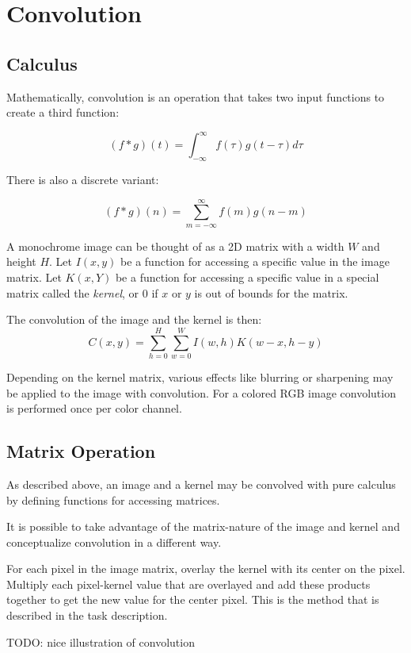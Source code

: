 \section{Convolution}
\subsection{Calculus}
Mathematically, convolution is an operation that takes two input functions to create a third function:

\[
    (f * g)(t) = \int^{\infty}_{-\infty}{f(\tau)g(t-\tau) d\tau}
\]

There is also a discrete variant:

\[
    (f * g)(n) = \sum^{\infty}_{m=-\infty}{f(m)g(n-m)}
\]

A monochrome image can be thought of as a 2D matrix with a width $W$ and height $H$.
Let $I(x, y)$ be a function for accessing a specific value in the image matrix.
Let $K(x, Y)$ be a function for accessing a specific value in a special matrix called the \textit{kernel},
or $0$ if $x$ or $y$ is out of bounds for the matrix.

The convolution of the image and the kernel is then:
\[
    C(x, y) = \sum^{H}_{h=0} \sum^{W}_{w=0}{I(w, h)K(w - x, h -y)}
\]

Depending on the kernel matrix,
various effects like blurring or sharpening may be applied to the image with convolution.
For a colored RGB image convolution is performed once per color channel.

\subsection{Matrix Operation}
As described above, an image and a kernel may be convolved with pure calculus by defining functions for accessing matrices.

It is possible to take advantage of the matrix-nature of the image and kernel and conceptualize convolution in a different way.

For each pixel in the image matrix, overlay the kernel with its center on the pixel.
Multiply each pixel-kernel value that are overlayed and add these products together to get the new value for the center pixel.
This is the method that is described in the task description.

TODO: nice illustration of convolution

